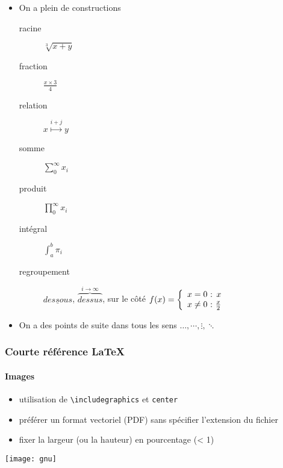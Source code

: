 \begin{frame}[allowframebreaks]
\begin{itemize}
  \item On a plein de constructions

    \begin{description}
    \item[racine] $ \sqrt[3]{x + y} $
    \item[fraction] $ \frac{x\times 3}{4} $
    \item[relation] $ x \stackrel{i+j}{\longmapsto} y $
    \item[somme] $ \sum_{0}^{\infty} x_{i} $
    \item[produit] $ \prod_{0}^{\infty} x_{i} $
    \item[intégral] $ \int_{a}^{b} \pi_{i} $
    \item[regroupement]
      $ \underline{dessous} $,
      $ \overbrace{dessus}^{i\rightarrow\infty} $,
      sur le côté
      \begin{math} %
        f(x) = \left\{
          \begin{array}{l@{~:~}r}
            x = 0 & x \\
            x \neq 0 & \frac{x}{2}
          \end{array}
        \right.
      \end{math}
    \end{description}

  \item On a des points de suite dans tous les sens $ \dots, \cdots, \vdots, \ddots $
  \end{itemize}
\end{frame}


\begin{frame}[fragile]
  \frametitle{Courte référence \LaTeX{}}
  \framesubtitle{Images}

  \begin{itemize}
  \item utilisation de \verb|\includegraphics| et \verb|center|
  \item préférer un format vectoriel (PDF) sans spécifier l'extension du fichier
  \item fixer la largeur (ou la hauteur) en pourcentage (< 1)
  \end{itemize}

  \begin{center}
    \texttt{[image: gnu]}
  \end{center}
  
\end{frame}

